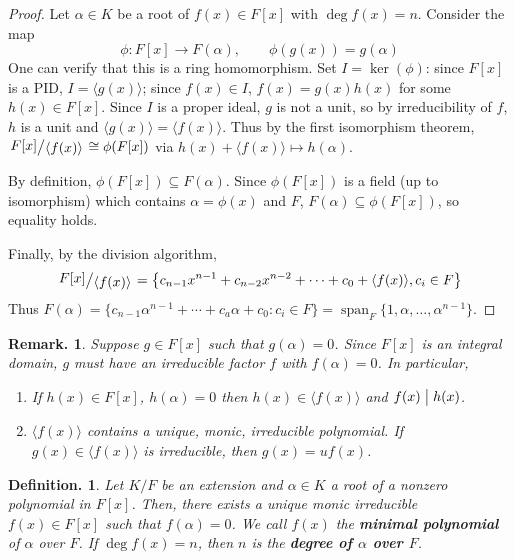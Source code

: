 \documentclass[11pt, a4paper]{memoir}
\newcommand{\mbf}[1]{{\boldmath\bfseries #1}}
\newcommand{\brac}[1]{\ensuremath{\left\langle #1 \right\rangle}}
\renewcommand{\div}{\bigm|}
\theoremstyle{change}
\theoremstyle{plain}
\theoremstyle{nonumberplain}
\newtheorem{definition}{Definition.}
\newtheorem{remark}{Remark.}
\newtheorem{proof}{Proof}
\DeclareMathOperator{\spn}{span}
\newcommand{\quot}[2]{\mathchoice{\left.\raisebox{0.14em}{$#1$}\middle/\raisebox{-0.14em}{$#2$}\right.}
                                 {\left.\raisebox{0.08em}{$#1$}\middle/\raisebox{-0.08em}{$#2$}\right.}
                                 {\left.\raisebox{0.03em}{$#1$}\middle/\raisebox{-0.03em}{$#2$}\right.}
                                 {\left.\raisebox{0em}{$#1$}\middle/\raisebox{0em}{$#2$}\right.}}
\numberwithin{equation}{section}
\begin{document}
\begin{proof}
    Let $\alpha\in K$ be a root of $f(x)\in F[x]$ with $\deg f(x)=n$.
    Consider the map
    \begin{equation*}
        \phi:F[x]\to F(\alpha),\qquad\phi(g(x))=g(\alpha)
    \end{equation*}
    One can verify that this is a ring homomorphism.
    Set $I=\ker(\phi)$: since $F[x]$ is a PID, $I=\langle g(x)\rangle$; since $f(x)\in I$, $f(x)=g(x)h(x)$ for some $h(x)\in F[x]$.
    Since $I$ is a proper ideal, $g$ is not a unit, so by irreducibility of $f$, $h$ is a unit and $\langle g(x)\rangle=\langle f(x)\rangle$.
    Thus by the first isomorphism theorem, $\quot{F[x]}{\langle f(x)\rangle}\cong \phi(F[x])$ via $h(x)+\langle f(x)\rangle\mapsto h(\alpha)$.

    By definition, $\phi(F[x])\subseteq F(\alpha)$.
    Since $\phi(F[x])$ is a field (up to isomorphism) which contains $\alpha=\phi(x)$ and $F$, $F(\alpha)\subseteq\phi(F[x])$, so equality holds.

    Finally, by the division algorithm,
    \begin{equation*}
        \quot{F[x]}{\brac{f(x)}}=\bigl\{c_{n-1}x^{n-1}+c_{n-2}x^{n-2}+\cdots+c_0+\langle f(x)\rangle,c_i\in F\bigr\}
    \end{equation*}
    Thus $F(\alpha)=\{c_{n-1}\alpha^{n-1}+\cdots+c_a\alpha+c_0:c_i\in F\}=\spn_F\{1,\alpha,\ldots,\alpha^{n-1}\}$.
\end{proof}
\begin{remark}
    Suppose $g\in F[x]$ such that $g(\alpha)=0$.
    Since $F[x]$ is an integral domain, $g$ must have an irreducible factor $f$ with $f(\alpha)=0$.
    In particular,
    \begin{enumerate}[nolistsep]
        \item If $h(x)\in F[x]$, $h(\alpha)=0$ then $h(x)\in\langle f(x)\rangle$ and $f(x)\div h(x)$.
        \item $\langle f(x)\rangle$ contains a unique, monic, irreducible polynomial.
            If $g(x)\in\langle f(x)\rangle$ is irreducible, then $g(x)=uf(x)$.
    \end{enumerate}
\end{remark}
\begin{definition}
    Let $K/F$ be an extension and $\alpha\in K$ a root of a nonzero polynomial in $F[x]$.
    Then, there exists a unique monic irreducible $f(x)\in F[x]$ such that $f(\alpha)=0$.
    We call $f(x)$ the \mbf{minimal polynomial} of $\alpha$ over $F$.
    If $\deg f(x)=n$, then $n$ is the \mbf{degree of $\alpha$ over $F$}.
\end{definition}
\end{document}
